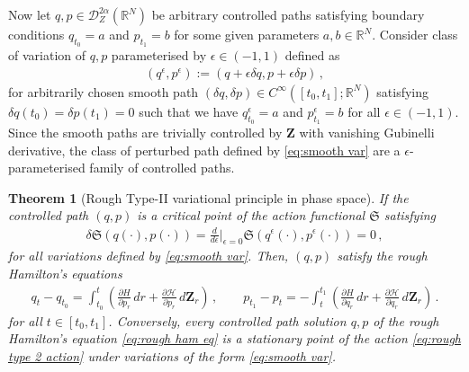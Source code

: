 \documentclass[11pt, oneside]{article}
\numberwithin{equation}{section}
\newtheorem{theorem}{Theorem}[section]
\theoremstyle{definition}
\newcommand{\mc}[1]{\mathcal{#1}}
\newcommand{\mcal}[1]{\mc{#1}}
\def\p{{\partial}}
\def\eps{{\epsilon}}
\def\p{\partial}
\begin{document}
Now let $q,p \in \mcal{D}^{2\alpha}_Z(\mathbb{R}^N)$ be arbitrary controlled paths satisfying boundary conditions $q_{t_0} = a$ and $p_{t_1} = b$ for some given parameters $a, b \in \mathbb{R}^N$. Consider class of variation of $q,p$ parameterised by $\epsilon \in (-1, 1)$ defined as
\begin{align}
    (q^\epsilon, p^\epsilon) := (q + \epsilon \delta q, p + \epsilon \delta p)\,, \label{eq:smooth var}
\end{align}
for arbitrarily chosen smooth path $(\delta q, \delta p) \in C^\infty([t_0, t_1];\mathbb{R}^N)$ satisfying $\delta q(t_0) = \delta p(t_1) = 0$ such that we have $q^\epsilon_{t_0} = a$ and $p^\epsilon_{t_1} = b$ for all $\epsilon \in (-1, 1)$. Since the smooth paths are trivially controlled by $\mathbf{Z}$ with vanishing Gubinelli derivative, the class of perturbed path defined by \eqref{eq:smooth var} are a $\eps$-parameterised family of controlled paths.
\begin{theorem}[Rough Type-II variational principle in phase space]\label{thm:RVP}
    If the controlled path $(q,p)$ is a critical point of the action functional $\mathfrak{S}$ satisfying 
    \begin{align}
        \delta \mathfrak{S}(q(\cdot), p(\cdot)) = \frac{d}{d\epsilon} \bigg|_{\epsilon = 0} \mathfrak{S}(q^\epsilon(\cdot), p^\epsilon(\cdot)) = 0\,, \label{eq:rough type 2 action variations}
    \end{align}
    for all variations defined by \eqref{eq:smooth var}. Then, $(q,p)$ satisfy the rough Hamilton's equations
    \begin{align}
        q_t - q_{t_0} = \int_{t_0}^t \left(\frac{\p H}{\p p_r}\,dr + \frac{\p \mcal{H}}{\p p_r}\, d\mathbf{Z}_r\right) \,, \qquad p_{t_1} - p_t = - \int_t^{t_1} \left(\frac{\p H}{\p q_r}\,dr + \frac{\p \mcal{H}}{\p q_r}\, d\mathbf{Z}_r\right)\,.  \label{eq:rough ham eq}
    \end{align}
    for all $t \in [t_0, t_1]$. Conversely, every controlled path solution $q,p$ of the rough Hamilton's equation \eqref{eq:rough ham eq} is a stationary point of the action \eqref{eq:rough type 2 action} under variations of the form \eqref{eq:smooth var}.
\end{theorem}
\end{document}
